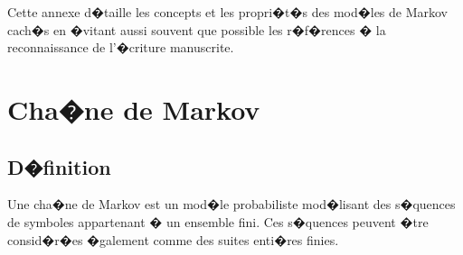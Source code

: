 
\firstpassagedo{}

\firstpassagedo{}







\label{annexe_hmm_def}




Cette annexe d�taille les concepts et les propri�t�s des mod�les de Markov cach�s en �vitant aussi souvent que possible les r�f�rences � la reconnaissance de l'�criture manuscrite.





\section{Cha�ne de Markov}

\subsection{D�finition}


Une cha�ne de Markov est un mod�le probabiliste mod�lisant des s�quences de symboles appartenant � un ensemble fini. Ces s�quences peuvent �tre consid�r�es �galement comme des suites enti�res finies.

